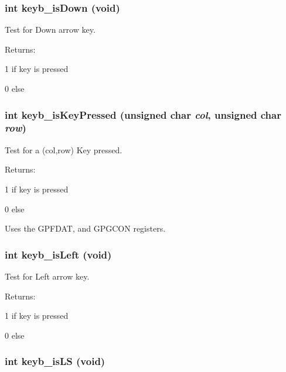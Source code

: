 \subsubsection{\setlength{\rightskip}{0pt plus 5cm}int keyb\_\-is\-Down (void)}\label{hpkeyb49_8h_a6}


Test for Down arrow key.

\begin{Desc}
\item[Returns: ]\par
1 if key is pressed \par
 0 else \end{Desc}
\subsubsection{\setlength{\rightskip}{0pt plus 5cm}int keyb\_\-is\-Key\-Pressed (unsigned char {\em col}, unsigned char {\em row})}\label{hpkeyb49_8h_a0}


Test for a (col,row) Key pressed.

\begin{Desc}
\item[Returns: ]\par
1 if key is pressed \par
 0 else\end{Desc}
Uses the GPFDAT, and GPGCON registers. 
\subsubsection{\setlength{\rightskip}{0pt plus 5cm}int keyb\_\-is\-Left (void)}\label{hpkeyb49_8h_a3}


Test for Left arrow key.

\begin{Desc}
\item[Returns: ]\par
1 if key is pressed \par
 0 else \end{Desc}
\subsubsection{\setlength{\rightskip}{0pt plus 5cm}int keyb\_\-is\-LS (void)}\label{hpkeyb49_8h_a8}



